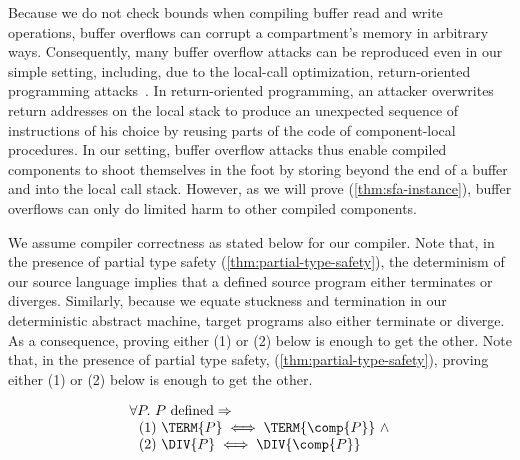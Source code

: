 \documentclass[10pt, conference, compsocconf, letterpaper, times]{IEEEtran}
\begin{document}
Because we do not check bounds when compiling buffer read and write
operations, buffer overflows can corrupt a compartment's memory in
arbitrary ways.
Consequently, many buffer overflow attacks can be reproduced even in our
simple setting,
including, due to the local-call optimization,
return-oriented programming attacks~\cite{Shacham07, Buchanan2008}.
\ifsooner
{}\fi
In return-oriented programming, an attacker overwrites return
addresses on the local stack to produce an unexpected sequence of
instructions of his choice by reusing parts of the code of
component-local procedures.
In our setting, buffer overflow attacks thus enable compiled components to
shoot themselves in the foot by storing beyond the end of a buffer and into
the local call stack.
\iffull
{}
However, as we will prove (\autoref{thm:sfa-instance}), buffer
overflows can only do limited harm to other compiled components.
\fi

We assume compiler correctness as stated below for our
compiler.  \iffull
Note that, in the presence of partial type safety
(\autoref{thm:partial-type-safety}),
the determinism of our source language implies that a defined source
program either terminates or diverges.
Similarly, because we equate stuckness and termination in our
deterministic abstract machine, target programs also either terminate
or diverge.
As a consequence, proving either (1) or (2) below is enough to get the
other.
\else{}
Note that, in the presence of partial type safety,
(\autoref{thm:partial-type-safety}), proving either (1)
or (2) below is enough to get the other.
\fi
{}



\begin{assumption}\label{assumption:compiler-correctness}
\[
\begin{array}{l}
\forall P.~ P\text{ defined} \Rightarrow \\
   \text{~~(1) }\TERM{P} \iff \TERM{\comp{P}}~\wedge \\
   \text{~~(2) }\DIV{P} \iff \DIV{\comp{P}}
\end{array}
\]
\end{assumption}
\end{document}
